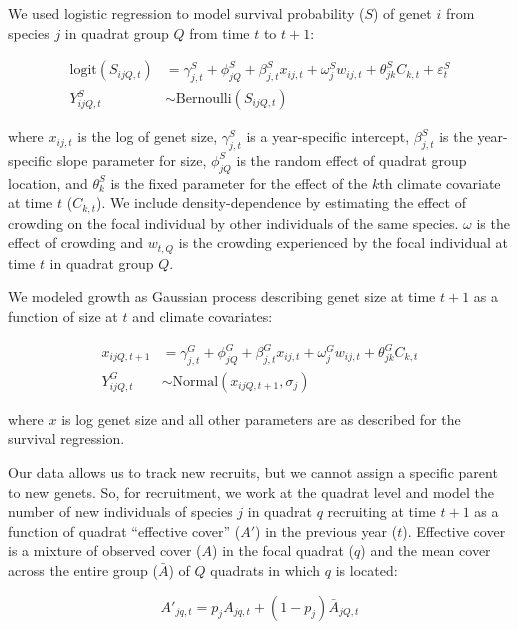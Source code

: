 \documentclass[12pt,]{article}
\begin{document}
We used logistic regression to model survival probability (\(S\)) of
genet \(i\) from species \(j\) in quadrat group \(Q\) from time \(t\) to
\(t+1\):

\begin{align}
\text{logit}(S_{ijQ,t}) &= \gamma^{S}_{j,t} + \phi^{S}_{jQ} + \beta^{S}_{j,t}x_{ij,t} + \omega^{S}_{j}w_{ij,t} + \theta^{S}_{jk}C_{k,t} + \varepsilon^{S}_{t} \\
Y^{S}_{ijQ,t} &\sim \text{Bernoulli}(S_{ijQ,t})
\end{align}

where \(x_{ij,t}\) is the log of genet size, \(\gamma^{S}_{j,t}\) is a
year-specific intercept, \(\beta^{S}_{j,t}\) is the year-specific slope
parameter for size, \(\phi^{S}_{jQ}\) is the random effect of quadrat
group location, and \(\theta^{S}_{k}\) is the fixed parameter for the
effect of the \(k\)th climate covariate at time \(t\) (\(C_{k,t}\)). We
include density-dependence by estimating the effect of crowding on the
focal individual by other individuals of the same species. \(\omega\) is
the effect of crowding and \(w_{t,Q}\) is the crowding experienced by
the focal individual at time \(t\) in quadrat group \(Q\).

We modeled growth as Gaussian process describing genet size at time
\(t+1\) as a function of size at \(t\) and climate covariates:

\begin{align}
x_{ijQ,t+1} &= \gamma^{G}_{j,t} + \phi^{G}_{jQ} + \beta^{G}_{j,t}x_{ij,t} + \omega^{G}_{j}w_{ij,t} + \theta^{G}_{jk}C_{k,t} \\
Y^{G}_{ijQ,t} &\sim \text{Normal}(x_{ijQ,t+1}, \sigma_{j})
\end{align}

where \(x\) is log genet size and all other parameters are as described
for the survival regression.

Our data allows us to track new recruits, but we cannot assign a
specific parent to new genets. So, for recruitment, we work at the
quadrat level and model the number of new individuals of species \(j\)
in quadrat \(q\) recruiting at time \(t+1\) as a function of quadrat
``effective cover'' (\(A'\)) in the previous year (\(t\)). Effective
cover is a mixture of observed cover (\(A\)) in the focal quadrat
(\(q\)) and the mean cover across the entire group (\(\bar{A}\)) of
\(Q\) quadrats in which \(q\) is located:

\begin{equation}
A'_{jq,t} = p_{j}A_{jq,t} + (1-p_{j})\bar{A}_{jQ,t}
\end{equation}
\end{document}

